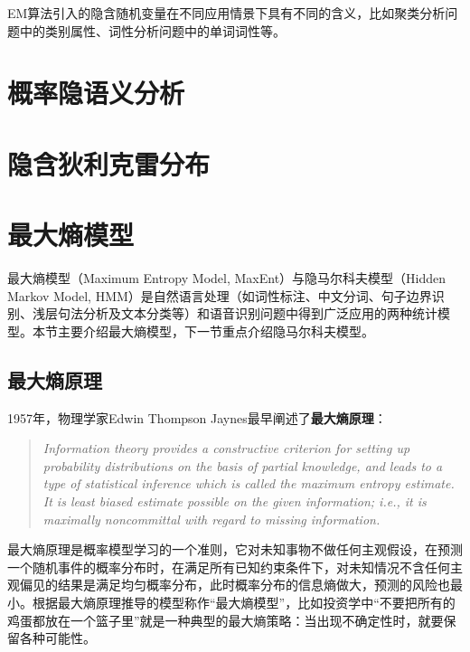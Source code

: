 EM算法引入的隐含随机变量在不同应用情景下具有不同的含义，比如聚类分析问题中的类别属性、词性分析问题中的单词词性等。
\section{概率隐语义分析}%
\section{隐含狄利克雷分布}%

\section{最大熵模型}
最大熵模型（Maximum Entropy Model, MaxEnt）与隐马尔科夫模型（Hidden Markov Model, HMM）\cite{jurafsky1999speech}是自然语言处理（如词性标注、中文分词、句子边界识别、浅层句法分析及文本分类等\cite{berger1996maximum}）和语音识别问题中得到广泛应用的两种统计模型。本节主要介绍最大熵模型，下一节重点介绍隐马尔科夫模型。

\subsection{最大熵原理}
1957年，物理学家Edwin Thompson Jaynes\cite{jaynes1957information1,jaynes1957information2}最早阐述了\textbf{最大熵原理}：
\begin{quote}
  \textit{Information theory provides a constructive criterion for setting up probability distributions on the basis of partial knowledge, and leads to a type of statistical inference which is called the maximum entropy estimate. It is least biased estimate possible on the given information; i.e., it is maximally noncommittal with regard to missing information.}
\end{quote}

最大熵原理是概率模型学习的一个准则，它对未知事物不做任何主观假设，在预测一个随机事件的概率分布时，在满足所有已知约束条件下，对未知情况不含任何主观偏见的结果是满足均匀概率分布，此时概率分布的信息熵做大，预测的风险也最小。根据最大熵原理推导的模型称作“最大熵模型”，比如投资学中“不要把所有的鸡蛋都放在一个篮子里”就是一种典型的最大熵策略：当出现不确定性时，就要保留各种可能性。

